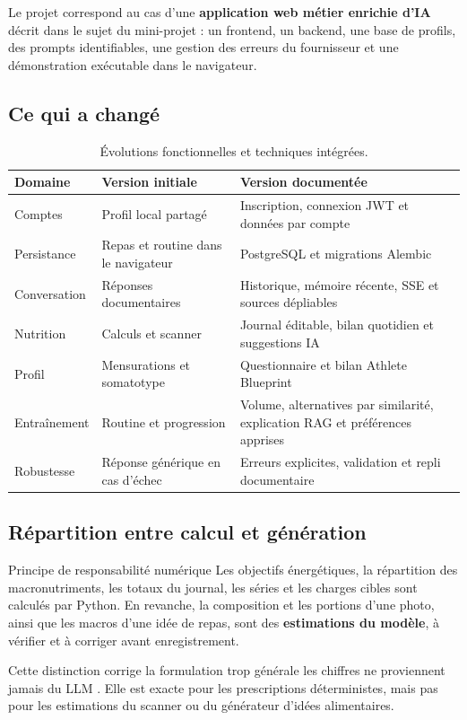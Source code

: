 \documentclass[11pt,a4paper]{article}
\begin{document}
Le projet correspond au cas d'une \textbf{application web métier enrichie d'IA} décrit dans le sujet du mini-projet : un frontend, un backend, une base de profils, des prompts identifiables, une gestion des erreurs du fournisseur et une démonstration exécutable dans le navigateur.

\subsection{Ce qui a changé}
\begin{table}[H]
\small\begin{tabularx}{\linewidth}{p{3.2cm}XX}
\toprule
\textbf{Domaine} & \textbf{Version initiale} & \textbf{Version documentée} \\
\midrule
Comptes & Profil local partagé & Inscription, connexion JWT et données par compte \\
Persistance & Repas et routine dans le navigateur & PostgreSQL et migrations Alembic \\
Conversation & Réponses documentaires & Historique, mémoire récente, SSE et sources dépliables \\
Nutrition & Calculs et scanner & Journal éditable, bilan quotidien et suggestions IA \\
Profil & Mensurations et somatotype & Questionnaire et bilan Athlete Blueprint \\
Entraînement & Routine et progression & Volume, alternatives par similarité, explication RAG et préférences apprises \\
Robustesse & Réponse générique en cas d'échec & Erreurs explicites, validation et repli documentaire \\
\bottomrule
\end{tabularx}
\caption{Évolutions fonctionnelles et techniques intégrées.}
\end{table}

\subsection{Répartition entre calcul et génération}
\begin{principlebox}{Principe de responsabilité numérique}
Les objectifs énergétiques, la répartition des macronutriments, les totaux du journal, les séries et les charges cibles sont calculés par Python. En revanche, la composition et les portions d'une photo, ainsi que les macros d'une idée de repas, sont des \textbf{estimations du modèle}, à vérifier et à corriger avant enregistrement.
\end{principlebox}
Cette distinction corrige la formulation trop générale \og les chiffres ne proviennent jamais du LLM \fg{}. Elle est exacte pour les prescriptions déterministes, mais pas pour les estimations du scanner ou du générateur d'idées alimentaires.
\end{document}
